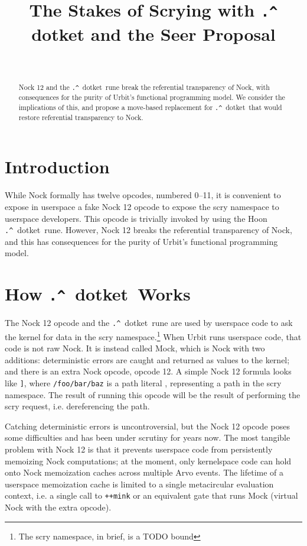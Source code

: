 \documentclass[twoside]{article}
\title{The Stakes of Scrying with \texttt{\string.\string^} dotket and the Seer Proposal}
\author{\authorname~\authorpatp \\ \affiliation}
\date{}
\newcommand{\dotket}{\texttt{\string.\string^}~dotket}
\begin{document}
\maketitle
\thispagestyle{firststyle}

\begin{abstract}
Nock 12 and the \dotket~rune break the referential transparency of Nock, with consequences for the purity of Urbit's functional programming model.  We consider the implications of this, and propose a move-based replacement for \dotket~that would restore referential transparency to Nock.
\end{abstract}

\setcounter{page}{1}

\tableofcontents

\section{Introduction}

While Nock formally has twelve opcodes, numbered 0--11, it is convenient to expose in userspace a fake Nock 12 opcode to expose the scry namespace to userspace developers.  This opcode is trivially invoked by using the Hoon \dotket~rune.  However, Nock 12 breaks the referential transparency of Nock, and this has consequences for the purity of Urbit's functional programming model.

\section{How \dotket~Works}

The Nock 12 opcode and the \dotket~rune are used by userspace code to ask the kernel for data in the scry namespace.\footnote{The scry namespace, in brief, is a TODO bound}  When Urbit runs userspace code, that code is not raw Nock.  It is instead called Mock, which is Nock with two additions:   deterministic errors are caught and returned as values to the kernel; and there is an extra Nock opcode, opcode 12.  A simple Nock 12 formula looks like \texttt{\string[12 \string[1 /foo/bar/baz\string]\string]}, where \texttt{/foo/bar/baz} is a path literal \texttt{}, representing a path in the scry namespace.  The result of running this opcode will be the result of performing the scry request, i.e. dereferencing the path.

Catching deterministic errors is uncontroversial, but the Nock 12 opcode poses some difficulties and has been under scrutiny for years now.  The most tangible problem with Nock 12 is that it prevents userspace code from persistently memoizing Nock computations; at the moment, only kernelspace code can hold onto Nock memoization caches across multiple Arvo events.  The lifetime of a userspace memoization cache is limited to a single metacircular evaluation context, i.e. a single call to \texttt{++mink} or an equivalent gate that runs Mock (virtual Nock with the extra opcode).
\end{document}

